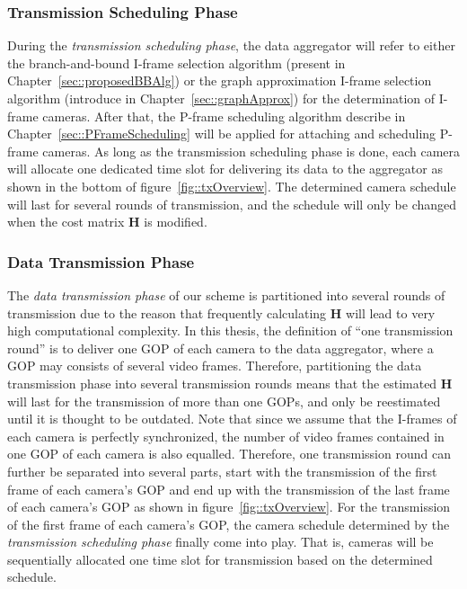 {\subsubsection{Transmission Scheduling Phase}
During the \emph{transmission scheduling phase}, the data aggregator will refer to either the branch-and-bound I-frame selection algorithm (present in Chapter~\ref{sec::proposedBBAlg}) or the graph approximation I-frame selection algorithm (introduce in Chapter~\ref{sec::graphApprox}) for the determination of I-frame cameras.
After that, the P-frame scheduling algorithm describe in Chapter~\ref{sec::PFrameScheduling} will be applied for attaching and scheduling P-frame cameras.
As long as the transmission scheduling phase is done, each camera will allocate one dedicated time slot for delivering its data to the aggregator as shown in the bottom of figure~\ref{fig::txOverview}.
The determined camera schedule will last for several rounds of transmission, and the schedule will only be changed when the cost matrix $\mathbf{H}$ is modified.
%
\subsubsection{Data Transmission Phase}
\label{sec::dataTransmissionPhase}
The \emph{data transmission phase} of our scheme is partitioned into several rounds of transmission due to the reason that frequently calculating $\mathbf{H}$ will lead to very high computational complexity.
In this thesis, the definition of ``one transmission round'' is to deliver one GOP of each camera to the data aggregator, where a GOP may consists of several video frames.
Therefore, partitioning the data transmission phase into several transmission rounds means that the estimated $\mathbf{H}$ will last for the transmission of more than one GOPs, and only be reestimated until it is thought to be outdated.
Note that since we assume that the I-frames of each camera is perfectly synchronized, the number of video frames contained in one GOP of each camera is also equalled.
Therefore, one transmission round can further be separated into several parts, start with the transmission of the first frame of each camera's GOP and end up with the transmission of the last frame of each camera's GOP as shown in figure~\ref{fig::txOverview}.
For the transmission of the first frame of each camera's GOP, the camera schedule determined by the \emph{transmission scheduling phase} finally come into play.
That is, cameras will be sequentially allocated one time slot for transmission based on the determined schedule.
%
}
